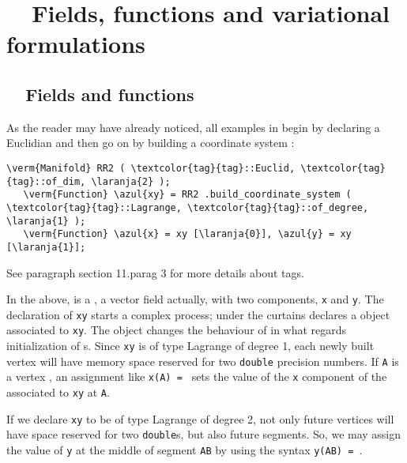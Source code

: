 
\chapter{~~Fields, functions and variational formulations}\label{\numb section 5}


\section{~~Fields and functions}\label{\numb section 5.\numb parag 1}

As the reader may have already noticed, all examples in {\maniFEM} begin by declaring a
Euclidian {\small\tt {}} and then go on by building a coordinate system :

\begin{Verbatim}[commandchars=\\\{\},formatcom=\small\tt,
   baselinestretch=0.94,framesep=2mm                     ]
   \verm{Manifold} RR2 ( \textcolor{tag}{tag}::Euclid, \textcolor{tag}{tag}::of_dim, \laranja{2} );
   \verm{Function} \azul{xy} = RR2 .build_coordinate_system ( \textcolor{tag}{tag}::Lagrange, \textcolor{tag}{tag}::of_degree, \laranja{1} );
   \verm{Function} \azul{x} = xy [\laranja{0}], \azul{y} = xy [\laranja{1}];
\end{Verbatim}

See paragraph \numb section 11.\numb parag 3 for more details about tags.

In the above, {\small\tt {}} is a {\small\tt {}}, a vector field actually,
with two components, {\small\tt x} and {\small\tt y}.
The declaration of {\small\tt xy} starts a complex process; under the curtains
{\maniFEM} declares a {\small\tt {}} object associated to {\small\tt xy}.
The {\small\tt {}} object changes the behaviour of {\maniFEM} in what regards
initialization of {\small\tt {}}s.
Since {\small\tt xy} is of type Lagrange of degree 1, each newly built vertex
{\small\tt {}} will have memory space reserved for two {\small\tt double}
precision numbers.
If {\small\tt A} is a vertex {\small\tt {}}, an assignment like {\small\tt x(A) = }
sets the value of the {\small\tt x} component of the {\small\tt {}} associated to
{\small\tt xy} at {\small\tt A}.

If we declare {\small\tt xy} to be of type Lagrange of degree 2, not only future vertices will
have space reserved for two {\small\tt double}s, but also future segments.
So, we may assign the value of {\small\tt y} at the middle of segment {\small\tt AB} by using
the syntax {\small\tt y(AB) = }.

